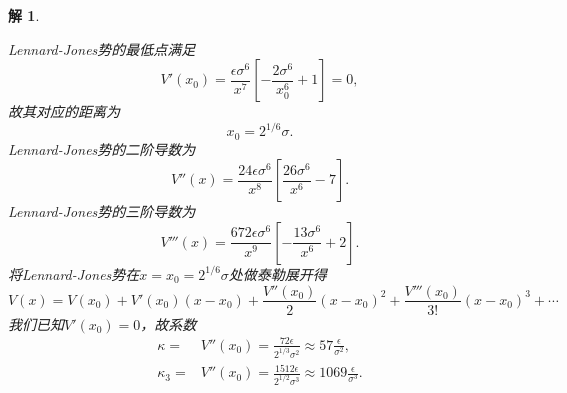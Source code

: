 \documentclass[UTF8,10pt,a4paper]{article}
\theoremstyle{Problem}
\theoremstyle{Solution}
\newtheorem*{sol}{解}
\begin{document}
\begin{sol}
\begin{itemize}
        Lennard-Jones势的最低点满足
        \begin{equation}
            V'(x_0)=\frac{\epsilon\sigma^6}{x^7}\left[-\frac{2\sigma^6}{x_0^6}+1\right]=0,
        \end{equation}
        故其对应的距离为
        \begin{equation}
            x_0=2^{1/6}\sigma.
        \end{equation}
        Lennard-Jones势的二阶导数为
        \begin{equation}
            V''(x)=\frac{24\epsilon\sigma^6}{x^8}\left[\frac{26\sigma^6}{x^6}-7\right].
        \end{equation}
        Lennard-Jones势的三阶导数为
        \begin{equation}
            V'''(x)=\frac{672\epsilon\sigma^6}{x^9}\left[-\frac{13\sigma^6}{x^6}+2\right].
        \end{equation}
        将Lennard-Jones势在$x=x_0=2^{1/6}\sigma$处做泰勒展开得
        \begin{equation}
            V(x)=V(x_0)+V'(x_0)(x-x_0)+\frac{V''(x_0)}{2}(x-x_0)^2+\frac{V'''(x_0)}{3!}(x-x_0)^3+\cdots
        \end{equation}
        我们已知$V'(x_0)=0$，故系数
        \begin{align}
            \kappa=&V''(x_0)=\frac{72\epsilon}{2^{1/3}\sigma^2}\approx 57\frac{\epsilon}{\sigma^2},\\
            \kappa_3=&V''(x_0)=\frac{1512\epsilon}{2^{1/2}\sigma^3}\approx 1069\frac{\epsilon}{\sigma^3}.
        \end{align}
    \end{itemize}
\end{sol}
\end{document}
